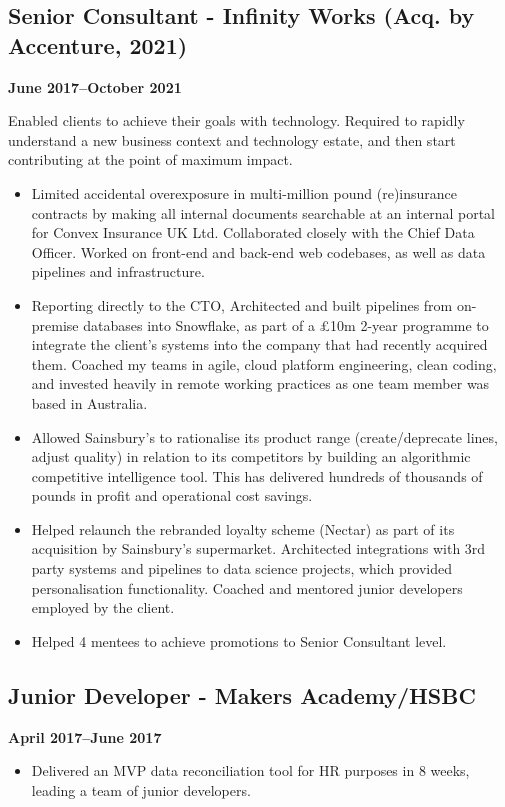 \documentclass[a4paper]{scrartcl}
\begin{document}
\subsection*{Senior Consultant - Infinity Works (Acq. by Accenture, 2021)}
\textbf{June 2017--October 2021}

Enabled clients to achieve their goals with technology. Required to rapidly understand a new business context and technology estate, and then start contributing at the point of maximum impact.
\begin{itemize}
	\item Limited accidental overexposure in multi-million pound
	      (re)insurance contracts by making
	      all internal documents searchable at an internal portal for Convex
	      Insurance UK Ltd. Collaborated closely with the Chief Data Officer. Worked on front-end and back-end web codebases, as well as data pipelines and infrastructure.
	\item Reporting directly to the CTO, Architected and built pipelines from on-premise databases into
	      Snowflake, as part of a £10m 2-year programme to integrate the
	      client's systems into the company that had recently acquired them.
	      Coached my teams in agile, cloud platform engineering, clean
	      coding,
	      and invested heavily in remote working practices as one team member
	      was based
	      in Australia.
	\item Allowed Sainsbury's to rationalise its product range (create/deprecate lines, adjust
	      quality) in relation to its competitors by
	      building an
	      algorithmic competitive intelligence tool. This has delivered
	      hundreds of
	      thousands of pounds in profit and operational cost savings.
	\item Helped relaunch the rebranded loyalty scheme (Nectar) as part of its acquisition by Sainsbury's supermarket. Architected integrations with 3rd party systems
	      and pipelines to data science projects, which provided personalisation functionality. Coached and mentored junior
	      developers
	      employed by the client.
	\item Helped 4 mentees to achieve
	      promotions to Senior Consultant level.
\end{itemize}

\subsection*{Junior Developer - Makers Academy/HSBC}
\textbf{April 2017--June 2017}
\begin{itemize}
	\item Delivered an MVP data reconciliation tool for HR purposes in 8
	      weeks, leading a team of junior developers.
\end{itemize}
\end{document}
